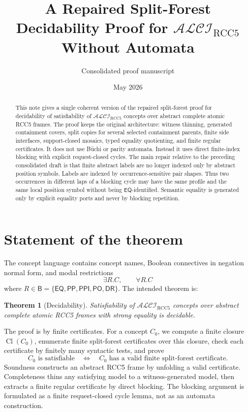 \documentclass[11pt]{article}
\title{A Repaired Split-Forest Decidability Proof for \texorpdfstring{$\mathcal{ALCI}_{\mathrm{RCC5}}$}{ALCI-RCC5} Without Automata}
\author{Consolidated proof manuscript}
\date{May 2026}
\newtheorem{theorem}{Theorem}[section]
\newcommand{\ALCIRCC}{\ensuremath{\mathcal{ALCI}_{\mathrm{RCC5}}}}
\newcommand{\Cl}{\operatorname{Cl}}
\newcommand{\Base}{\mathsf B}
\newcommand{\EQ}{\mathsf{EQ}}
\newcommand{\PP}{\mathsf{PP}}
\newcommand{\PPI}{\mathsf{PPI}}
\newcommand{\PO}{\mathsf{PO}}
\newcommand{\DR}{\mathsf{DR}}
\begin{document}
\maketitle

\begin{abstract}
This note gives a single coherent version of the repaired split-forest proof for decidability of satisfiability of \(\ALCIRCC\) concepts over abstract complete atomic RCC5 frames.  The proof keeps the original architecture: witness thinning, generated containment covers, split copies for several selected containment parents, finite side interfaces, support-closed mosaics, typed equality quotienting, and finite regular certificates.  It does not use Büchi or parity automata.  Instead it uses direct finite-index blocking with explicit request-closed cycles.  The main repair relative to the preceding consolidated draft is that finite abstract labels are no longer indexed only by abstract position symbols.  Labels are indexed by occurrence-sensitive pair shapes.  Thus two occurrences in different laps of a blocking cycle may have the same profile and the same local position symbol without being \(\EQ\)-identified.  Semantic equality is generated only by explicit equality ports and never by blocking repetition.
\end{abstract}

\tableofcontents

\section{Statement of the theorem}

The concept language contains concept names, Boolean connectives in negation normal form, and modal restrictions
\[
  \exists R.C,\qquad \forall R.C
\]
where \(R\in\Base=\{\EQ,\PP,\PPI,\PO,\DR\}\).  The intended theorem is:

\begin{theorem}[Decidability]\label{thm:main}
Satisfiability of \(\ALCIRCC\) concepts over abstract complete atomic RCC5 frames with strong equality is decidable.
\end{theorem}

The proof is by finite certificates.  For a concept \(C_0\), we compute a finite closure \(\Cl(C_0)\), enumerate finite split-forest certificates over this closure, check each certificate by finitely many syntactic tests, and prove
\[
  C_0 \text{ is satisfiable}
  \quad\Longleftrightarrow\quad
  C_0 \text{ has a valid finite split-forest certificate.}
\]
Soundness constructs an abstract RCC5 frame by unfolding a valid certificate.  Completeness thins any satisfying model to a witness-generated model, then extracts a finite regular certificate by direct blocking.  The blocking argument is formulated as a finite request-closed cycle lemma, not as an automata construction.
\end{document}
